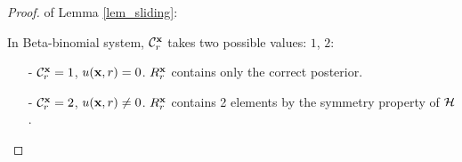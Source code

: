 \documentclass{article}
\begin{document}
\begin{proof} of Lemma \ref{lem_sliding}:

In Beta-binomial system, $\mathcal{C}^{\textbf{x}}_{r}$ takes two possible values: $1$, $2$:
\begin{itemize}
  \item[-] $\mathcal{C}^{\textbf{x}}_{r} = 1$, $u(\textbf{x}, {r}) = 0$.  $R^{\textbf{x}}_r$ contains only the correct posterior.
  \item[-] $\mathcal{C}^{\textbf{x}}_{r} = 2$, $u(\textbf{x}, {r}) \neq 0$. $R^{\textbf{x}}_r$ contains 2 elements by the symmetry property of $\mathcal{H}$.
\end{itemize}



\end{proof}
\end{document}
